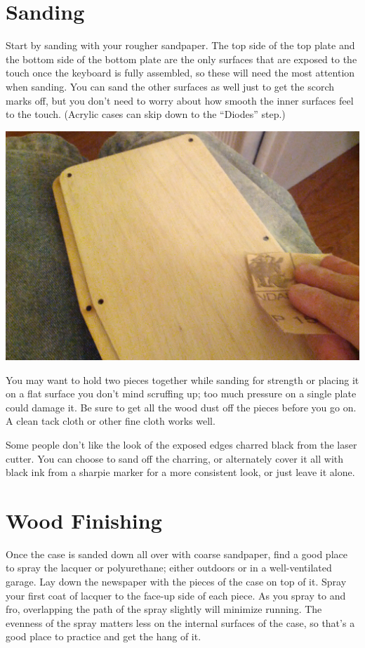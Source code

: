 \documentclass[landscape,twocolumn]{article}
\begin{document}
\section{Sanding}

Start by sanding with your rougher sandpaper. The top side of the
top plate and the bottom side of the bottom plate are the only
surfaces that are exposed to the touch once the keyboard is fully
assembled, so these will need the most attention when sanding. You can
sand the other surfaces as well just to get the scorch marks off, but
you don't need to worry about how smooth the inner surfaces feel to
the touch. (Acrylic cases can skip down to the ``Diodes'' step.)

\vspace{1em}
\begin{center}
  \includegraphics[width=0.7\columnwidth]{sanding.jpg}
\end{center}
\vspace{1em}

You may want to hold two pieces together while sanding for strength or
placing it on a flat surface you don't mind scruffing up; too much
pressure on a single plate could damage it. Be sure to get all the
wood dust off the pieces before you go on. A clean tack cloth or other
fine cloth works well.

\vspace{1em}

Some people don't like the look of the exposed edges charred black
from the laser cutter. You can choose to sand off the charring, or
alternately cover it all with black ink from a sharpie marker for a
more consistent look, or just leave it alone.

\section{Wood Finishing}

Once the case is sanded down all over with coarse sandpaper, find a
good place to spray the lacquer or polyurethane; either outdoors or in
a well-ventilated garage. Lay down the newspaper with the pieces of
the case on top of it. Spray your first coat of lacquer to the face-up
side of each piece. As you spray to and fro, overlapping the path of
the spray slightly will minimize running. The evenness of the spray
matters less on the internal surfaces of the case, so that's a good
place to practice and get the hang of it.
\end{document}
